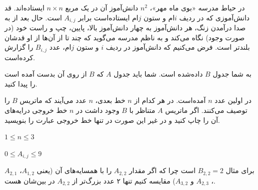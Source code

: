 \documentclass[11.5pt,a4paper,oneside]{article}
\begin{document}
\def\problemCode{school}
\def\problemEnglishTitle{}
\def\problemFarsiTitle{مدرسه}
\def\timeLimit{$2$ \second}
\def\memLimit{$256$ \megabytes}
\begin{problem}
در حیاط مدرسه «بوی‌ ماه مهر»، 
$n^2$
دانش‌آموز آن در یک مربع 
$n \times n$
ایستاده‌اند. قد دانش‌آموزی که در ردیف $i$ام و ستون $j$ام ایستاده‌است برابر
$A_{i, j}$
است. حال بعد از به صدا درآمدن زنگ، هر دانش‌آموز به چهار دانش‌آموز بالا، پایین، چپ و راست خود (در صورت وجود) نگاه می‌کند و به ناظم مدرسه می‌گوید که چند تا از آن‌ها از او قدشان بلندتر است. فرض می‌کنیم که دانش‌آموز در ردیف $i$ و ستون $j$ام، عدد
$B_{i, j}$
را گزارش کرده‌است.

به شما جدول $B$ داده‌شده‌ است. شما باید جدول $A$ که $B$ از روی آن بدست آمده است را پیدا کنید.

در اولین عدد $n$ آمده‌است.
در هر کدام از $n$ خط بعدی، $n$ عدد می‌آیند که ماتریس $B$ را توصیف می‌کنند.
\outputDescription
اگر ماتریس $A$ متناظر با $B$ وجود داشت در $n$ خط خروجی درایه‌های آن را چاپ کنید و در غیر این صورت در تنها خط خروجی عبارت  را بنویسید.

\constraints
\begin{shortitems}
\item $1 \le n \le 3$
\item $0 \le A_{i, j} \le 9$
\end{shortitems}

\sampleIO

\begin{example}
%
\end{example}

\sampleIODescription
برای مثال
$B_{2, 2}=2$
است چرا که اگر مقدار
$A_{2, 2}$
را با همسایه‌های آن (یعنی 
$A_{1, 2}$، $A_{2, 1}$، $A_{2, 3}$ و $A_{3, 2}$)
مقایسه کنیم تنها ۲ عدد بزرگ‌تر از
$A_{2, 2}$
در بین‌شان هست.

\end{problem}
\end{document}
